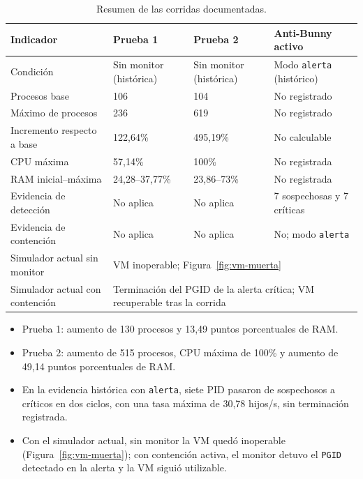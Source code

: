 \begin{table}[H]
  \centering
  \caption{Resumen de las corridas documentadas.}
  \label{tab:comparacion-resultados}
  \small
  \begin{tabular}{p{}p{}p{}p{}}
    \toprule
    Indicador & Prueba 1 & Prueba 2 & Anti-Bunny activo \\
    \midrule
    Condición & Sin monitor (histórica) & Sin monitor (histórica) & Modo \texttt{alerta} (histórico) \\
    Procesos base & 106 & 104 & No registrado \\
    Máximo de procesos & 236 & 619 & No registrado \\
    Incremento respecto a base & 122,64\% & 495,19\% & No calculable \\
    CPU máxima & 57,14\% & 100\% & No registrada \\
    RAM inicial--máxima & 24,28--37,77\% & 23,86--73\% & No registrada \\
    Evidencia de detección & No aplica & No aplica & 7 sospechosas y 7 críticas \\
    Evidencia de contención & No aplica & No aplica & No; modo \texttt{alerta} \\
    Simulador actual sin monitor & \multicolumn{3}{p{0.62\textwidth}}{VM inoperable; Figura~\ref{fig:vm-muerta}} \\
    Simulador actual con contención & \multicolumn{3}{p{0.62\textwidth}}{Terminación del PGID de la alerta crítica; VM recuperable tras la corrida} \\
    \bottomrule
  \end{tabular}
\end{table}

\begin{itemize}
  \item Prueba 1: aumento de 130 procesos y 13,49 puntos porcentuales de RAM.
  \item Prueba 2: aumento de 515 procesos, CPU máxima de 100\% y aumento de
        49,14 puntos porcentuales de RAM.
  \item En la evidencia histórica con \texttt{alerta}, siete PID pasaron de sospechosos a críticos en dos
        ciclos, con una tasa máxima de 30,78 hijos/s, sin terminación registrada.
  \item Con el simulador actual, sin monitor la VM quedó inoperable
        (Figura~\ref{fig:vm-muerta}); con contención activa, el monitor detuvo el
        \texttt{PGID} detectado en la alerta y la VM siguió utilizable.
\end{itemize}
